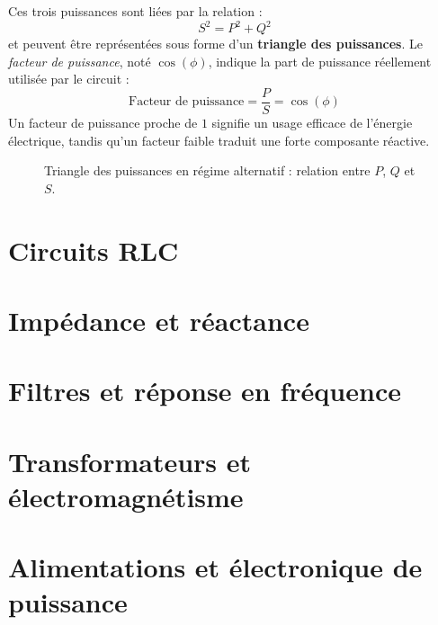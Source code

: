 Ces trois puissances sont li\'ees par la relation :
\[
S^2 = P^2 + Q^2
\]
et peuvent être repr\'esent\'ees sous forme d’un \textbf{triangle des puissances}.
Le \emph{facteur de puissance}, not\'e $\cos(\phi)$, indique la part de puissance r\'eellement utilis\'ee par le circuit :
\[
\text{Facteur de puissance} = \frac{P}{S} = \cos(\phi)
\]
Un facteur de puissance proche de \(1\) signifie un usage efficace de l’\'energie \'electrique, tandis qu’un facteur faible traduit une forte composante r\'eactive.
\begin{figure}[h!]
\centering
{}
\caption{Triangle des puissances en r\'egime alternatif : relation entre $P$, $Q$ et $S$.}
\label{fig:triangle_puissances}
\end{figure}

\section{Circuits RLC} \label{subsec:rlc_circuits}
\section{Imp\'edance et r\'eactance} \label{subsec:impedance_reactance}
\section{Filtres et r\'eponse en fr\'equence} \label{subsec:filters}
\section{Transformateurs et \'electromagn\'etisme} \label{subsec:transformers}
\section{Alimentations et \'electronique de puissance} \label{subsec:power_supplies}
